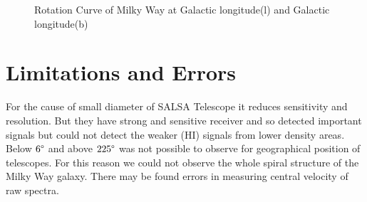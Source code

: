 \documentclass[conference]{IEEEtran}
\begin{document}
\begin{figure}[!t]
{\label{fig_sixth_case}}
\hfil
{}
\hfil
{}
\hfil
\caption{Rotation Curve of Milky Way at Galactic longitude(l) and Galactic longitude(b)}
\label{fig:rot}
\end{figure}

\section{Limitations and Errors}

For the cause of small diameter of SALSA Telescope it reduces sensitivity and resolution. But they have strong and sensitive receiver and so detected important signals but could not detect the weaker (HI) signals from lower density areas. Below $6\degree$ and above $225\degree$ was not possible to observe for geographical position of telescopes. For this reason we could not observe the whole spiral structure of the Milky Way galaxy. There may be found errors in measuring central velocity of raw spectra\cite{CathyHorellou2015,santo2013mapping}.
\end{document}
